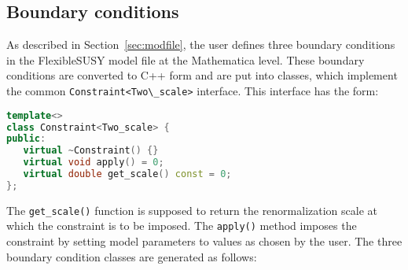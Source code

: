\documentclass[final,3p,11pt,pdflatex]{elsarticle}
\makeatletter
\newcommand{\fs}{FlexibleSUSY\@\xspace}
\newcommand{\mathematica}{Mathematica\xspace}
\newcommand{\code}[1]{\lstinline|#1|}  %
\newcommand{\secref}[1]{Section~\ref{#1}}
\makeatother
\begin{document}
\subsection{Boundary conditions}
\label{sec:boundary-conditions}

As described in \secref{sec:modfile}, the user defines three boundary
conditions in the \fs model file at the \mathematica level.  These
boundary conditions are converted to C++ form and are put into
classes, which implement the common \code{Constraint<Two\_scale>}
interface.  This interface has the form:
%
\begin{lstlisting}[language=C++]
template<>
class Constraint<Two_scale> {
public:
   virtual ~Constraint() {}
   virtual void apply() = 0;
   virtual double get_scale() const = 0;
};
\end{lstlisting}
%
The \code{get_scale()} function is supposed to return the
renormalization scale at which the constraint is to be imposed.  The
\code{apply()} method imposes the constraint by setting model
parameters to values as chosen by the user.  The three boundary
condition classes are generated as follows:
%
\end{document}

